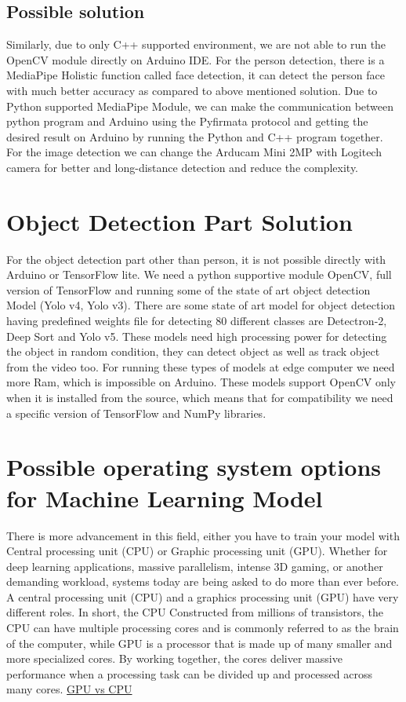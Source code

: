 \subsection{Possible solution}
Similarly, due to only C++ supported environment, we are not able to run the OpenCV module directly on Arduino IDE. For the person detection, there is a MediaPipe Holistic function called face detection, it can detect the person face with much better accuracy as compared to above mentioned solution. Due to Python supported MediaPipe Module, we can make the communication between python program and Arduino using the Pyfirmata protocol and getting the desired result on Arduino by running the Python and C++ program together. For the image detection we can change the Arducam Mini 2MP with Logitech camera for better and long-distance detection and reduce the complexity. 
\section{Object Detection Part Solution}
For the object detection part other than person, it is not possible directly with Arduino or TensorFlow lite. We need a python supportive module OpenCV, full version of TensorFlow and running some of the state of art object detection Model (Yolo v4, Yolo v3). There are some state of art model for object detection having predefined weights file for detecting 80 different classes are Detectron-2, Deep Sort and Yolo v5. These models need high processing power for detecting the object in random condition, they can detect object as well as track object from the video too. For running these types of models at edge computer we need more Ram, which is impossible on Arduino. These models support OpenCV only when it is installed from the source, which means that for compatibility we need a specific version of TensorFlow and NumPy libraries. 
\section{Possible operating system options for Machine Learning Model}
There is more advancement in this field, either you have to train your model with Central processing unit (CPU) or Graphic processing unit (GPU). Whether for deep learning applications, massive parallelism, intense 3D gaming, or another demanding workload, systems today are being asked to do more than ever before. A central processing unit (CPU) and a graphics processing unit (GPU) have very different roles. In short, the CPU Constructed from millions of transistors, the CPU can have multiple processing cores and is commonly referred to as the brain of the computer, while GPU is a processor that is made up of many smaller and more specialized cores. By working together, the cores deliver massive performance when a processing task can be divided up and processed across many cores. \href{https://www.intel.com/content/www/us/en/products/docs/processors/cpu-vs-gpu.html} {GPU vs CPU}
